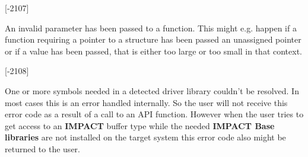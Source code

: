 \begin{Desc}
\begin{description}
{\bfseries }\mbox{[}-\/2107\mbox{]} \item[{\em 
\hypertarget{group___common_interface_gga112225e5fbaaaef6445ff4ebf98f8e03a556fcf72ff59405d5955691b8ee13720}{D\+M\+R\+\_\+\+I\+N\+V\+A\+L\+I\+D\+\_\+\+P\+A\+R\+A\+M\+E\+T\+E\+R}\label{group___common_interface_gga112225e5fbaaaef6445ff4ebf98f8e03a556fcf72ff59405d5955691b8ee13720}
}]An invalid parameter has been passed to a function. This might e.\+g. happen if a function requiring a pointer to a structure has been passed an unassigned pointer or if a value has been passed, that is either too large or too small in that context.

{\bfseries }\mbox{[}-\/2108\mbox{]} \item[{\em 
\hypertarget{group___common_interface_gga112225e5fbaaaef6445ff4ebf98f8e03ac7247b5bddc3a129ed29e2691ac6d5fd}{D\+M\+R\+\_\+\+E\+X\+P\+O\+R\+T\+E\+D\+\_\+\+S\+Y\+M\+B\+O\+L\+\_\+\+N\+O\+T\+\_\+\+F\+O\+U\+N\+D}\label{group___common_interface_gga112225e5fbaaaef6445ff4ebf98f8e03ac7247b5bddc3a129ed29e2691ac6d5fd}
}]One or more symbols needed in a detected driver library couldn't be resolved. In most cases this is an error handled internally. So the user will not receive this error code as a result of a call to an A\+P\+I function. However when the user tries to get access to an {\bfseries I\+M\+P\+A\+C\+T} buffer type while the needed {\bfseries I\+M\+P\+A\+C\+T Base libraries} are not installed on the target system this error code also might be returned to the user.


\end{description}
\end{Desc}
